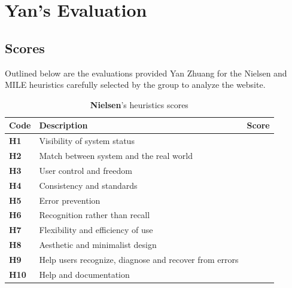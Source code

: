 
\section{Yan's Evaluation}
\subsection{Scores}
Outlined below are the evaluations provided Yan Zhuang for the Nielsen and MILE heuristics carefully selected by the group to analyze the website.\\
\begin{table}[htp!]
	\centering
	\begin{tabular}{ |l|l|c| }
		\hline
		\textbf{Code} & \textbf{Description} & \textbf{Score}\\
		\hline
		\textbf{H1} & Visibility of system status & \textbf{\color{unicefOrange}{3}}\\
		\hline
		\textbf{H2} & Match between system and the real world & \textbf{\color{unicefGreen}{4}}\\
		\hline
		\textbf{H3} & User control and freedom & \textbf{\color{unicefGreen}{4}}\\
		\hline
		\textbf{H4} & Consistency and standards & \textbf{\color{unicefGreen}{4}}\\
		\hline
		\textbf{H5} & Error prevention & \textbf{\color{unicefGreen}{4}}\\
		\hline
		\textbf{H6} & Recognition rather than recall & \textbf{\color{unicefGreen}{4}}\\
		\hline
		\textbf{H7} & Flexibility and efficiency of use & \textbf{\color{unicefOrange}{3}}\\
		\hline
		\textbf{H8} & Aesthetic and minimalist design & \textbf{\color{unicefGreen}{4}}\\
		\hline
		\textbf{H9} & Help users recognize, diagnose and recover from errors & \textbf{\color{unicefGreen}{4}}\\
		\hline
		\textbf{H10} & Help and documentation & \textbf{\color{unicefGreen}{5}}\\
		\hline
	\end{tabular}
	\caption{\textbf{Nielsen}'s heuristics scores}
\end{table}
